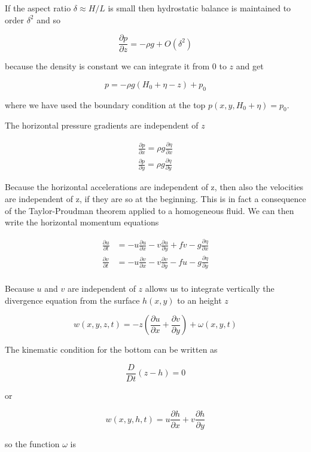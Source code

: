 If the aspect ratio \(\delta \approx H/L\) is small then hydrostatic
balance is maintained to order \(\delta^2\) and so

\[\frac{\partial p}{\partial z} = - \rho g + O(\delta^2)\]

because the density is constant we can integrate it from 0 to \(z\) and
get

\[p = -\rho g (H_0+ \eta -z) + p_0\]

where we have used the boundary condition at the top
\(p(x,y,H_0 +\eta) = p_0\).

The horizontal pressure gradients are independent of \(z\)

\[\begin{aligned}
\frac{\partial p}{\partial x} = \rho g \frac{\partial \eta}{\partial x}\\
\frac{\partial p}{\partial y} = \rho g \frac{\partial \eta}{\partial y}
\end{aligned}\]

Because the horizontal accelerations are independent of z, then also the
velocities are independent of z, if they are so at the beginning. This
is in fact a consequence of the Taylor-Proudman theorem applied to a
homogeneous fluid. We can then write the horizontal momentum equations

\[\begin{aligned}
\frac{\partial u}{\partial t} &= -u \frac{\partial u}{\partial x} -v \frac{\partial u}{\partial y} + f v -g\frac{\partial \eta}{\partial x} \\
\frac{\partial v}{\partial t} &= -u \frac{\partial v}{\partial x} -v \frac{\partial v}{\partial y} - f u -g\frac{\partial \eta}{\partial y}  \\
\end{aligned}\]

Because \(u\) and \(v\) are independent of \(z\) allows us to integrate
vertically the divergence equation from the surface \(h(x,y)\) to an
height \(z\)

\[w(x,y,z,t) = -z\left(\frac{\partial u}{\partial x} + \frac{\partial v}{\partial y}\right) + \omega(x,y,t)\]

The kinematic condition for the bottom can be written as

\[\frac{D }{Dt}{(z-h)} = 0\]

or

\[w(x,y,h,t) =  u\frac{\partial h}{\partial x} + v\frac{\partial h}{\partial y}\]

so the function \(\omega\) is

